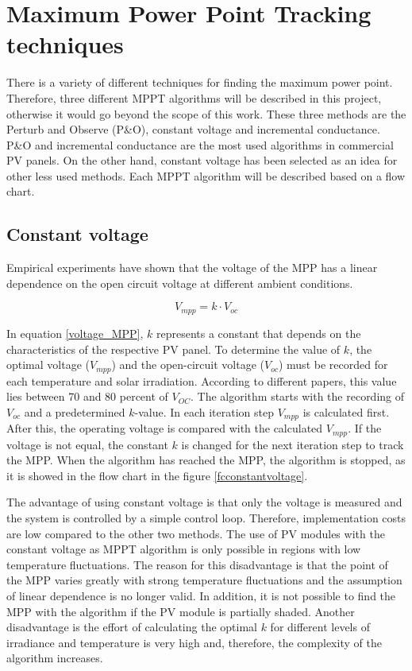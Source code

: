 \section{Maximum Power Point Tracking techniques\label{MPPTalgo}}

There is a variety of different techniques for finding the maximum power point. Therefore, three different MPPT algorithms will be described in this project, otherwise it would go beyond the scope of this work. These three methods are the Perturb and Observe (P\&O), constant voltage and incremental conductance. P\&O and incremental conductance are the most used algorithms in commercial PV panels. On the other hand, constant voltage has been selected as an idea for other less used methods. Each MPPT algorithm will be described based on a flow chart. 

\subsection{Constant voltage}
Empirical experiments have shown that the voltage of the MPP has a linear dependence on the open circuit voltage at different ambient conditions\cite{flowchartVC}.

\begin{equation} \label{voltage_MPP}
V_{mpp} = k \cdot V_{oc}	
\end{equation} 

In equation \ref{voltage_MPP}, $k$ represents a constant that depends on the characteristics of the respective PV panel. To determine the value of $k$, the optimal voltage ($V_{mpp}$) and the open-circuit voltage ($V_{oc}$) must be recorded for each temperature and solar irradiation. According to different papers, this value lies between 70 and 80 percent of $V_{OC}$\cite{MPPTResearch}. The algorithm starts with the recording of $V_{oc}$ and a predetermined $k$-value. In each iteration step $V_{mpp}$ is calculated first. After this, the operating voltage is compared with the calculated $V_{mpp}$. If the voltage is not equal, the constant $k$ is changed for the next iteration step to track the MPP. When the algorithm has reached the MPP, the algorithm is stopped, as it is showed in the flow chart in the figure \ref{fcconstantvoltage}. \cite{flowchartVC}

The advantage of using constant voltage is that only the voltage is measured and the system is controlled by a simple control loop. Therefore, implementation costs are low compared to the other two methods. The use of PV modules with the constant voltage as MPPT algorithm is only possible in regions with low temperature fluctuations. The reason for this disadvantage is that the point of the MPP varies greatly with strong temperature fluctuations and the assumption of linear dependence is no longer valid. In addition, it is not possible to find the MPP with the algorithm if the PV module is partially shaded. Another disadvantage is the effort of calculating the optimal $k$ for different levels of irradiance and temperature is very high and, therefore, the complexity of the algorithm increases.\cite{flowchartVC}


